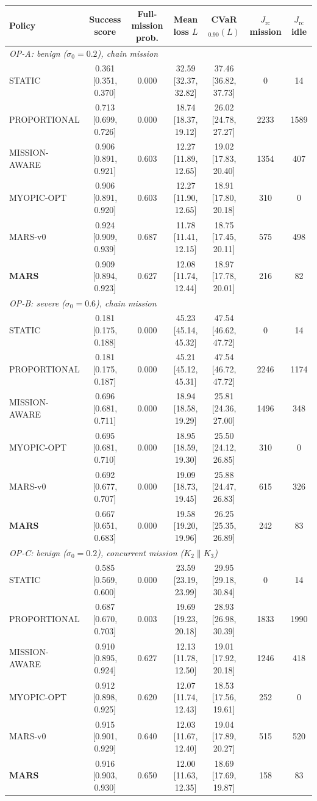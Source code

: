 \begin{tabular}{lcccccc}
\toprule
Policy & Success score & Full-mission prob. & Mean loss $L$ & CVaR$_{0.90}(L)$ & $J_{\mathrm{rc}}$ mission & $J_{\mathrm{rc}}$ idle\\
\midrule
\multicolumn{7}{l}{\emph{OP-A: benign ($\sigma_0=0.2$), chain mission}}\\
STATIC & 0.361 [0.351, 0.370] & 0.000 & 32.59 [32.37, 32.82] & 37.46 [36.82, 37.73] & 0 & 14\\
PROPORTIONAL & 0.713 [0.699, 0.726] & 0.000 & 18.74 [18.37, 19.12] & 26.02 [24.78, 27.27] & 2233 & 1589\\
MISSION-AWARE & 0.906 [0.891, 0.921] & 0.603 & 12.27 [11.89, 12.65] & 19.02 [17.83, 20.40] & 1354 & 407\\
MYOPIC-OPT & 0.906 [0.891, 0.920] & 0.603 & 12.27 [11.90, 12.65] & 18.91 [17.80, 20.18] & 310 & 0\\
MARS-v0 & 0.924 [0.909, 0.939] & 0.687 & 11.78 [11.41, 12.15] & 18.75 [17.45, 20.11] & 575 & 498\\
\textbf{MARS} & 0.909 [0.894, 0.923] & 0.627 & 12.08 [11.74, 12.44] & 18.97 [17.78, 20.01] & 216 & 82\\
\midrule
\multicolumn{7}{l}{\emph{OP-B: severe ($\sigma_0=0.6$), chain mission}}\\
STATIC & 0.181 [0.175, 0.188] & 0.000 & 45.23 [45.14, 45.32] & 47.54 [46.62, 47.72] & 0 & 14\\
PROPORTIONAL & 0.181 [0.175, 0.187] & 0.000 & 45.21 [45.12, 45.31] & 47.54 [46.72, 47.72] & 2246 & 1174\\
MISSION-AWARE & 0.696 [0.681, 0.711] & 0.000 & 18.94 [18.58, 19.29] & 25.81 [24.36, 27.00] & 1496 & 348\\
MYOPIC-OPT & 0.695 [0.681, 0.710] & 0.000 & 18.95 [18.59, 19.30] & 25.50 [24.12, 26.85] & 310 & 0\\
MARS-v0 & 0.692 [0.677, 0.707] & 0.000 & 19.09 [18.73, 19.45] & 25.88 [24.47, 26.83] & 615 & 326\\
\textbf{MARS} & 0.667 [0.651, 0.683] & 0.000 & 19.58 [19.20, 19.96] & 26.25 [25.35, 26.89] & 242 & 83\\
\midrule
\multicolumn{7}{l}{\emph{OP-C: benign ($\sigma_0=0.2$), concurrent mission ($K_2\parallel K_3$)}}\\
STATIC & 0.585 [0.569, 0.600] & 0.000 & 23.59 [23.19, 23.99] & 29.95 [29.18, 30.84] & 0 & 14\\
PROPORTIONAL & 0.687 [0.670, 0.703] & 0.003 & 19.69 [19.23, 20.18] & 28.93 [26.98, 30.39] & 1833 & 1990\\
MISSION-AWARE & 0.910 [0.895, 0.924] & 0.627 & 12.13 [11.78, 12.50] & 19.01 [17.92, 20.18] & 1246 & 418\\
MYOPIC-OPT & 0.912 [0.898, 0.925] & 0.620 & 12.07 [11.74, 12.43] & 18.53 [17.56, 19.61] & 252 & 0\\
MARS-v0 & 0.915 [0.901, 0.929] & 0.640 & 12.03 [11.67, 12.40] & 19.04 [17.89, 20.27] & 515 & 520\\
\textbf{MARS} & 0.916 [0.903, 0.930] & 0.650 & 12.00 [11.63, 12.35] & 18.69 [17.69, 19.87] & 158 & 83\\
\bottomrule
\end{tabular}
